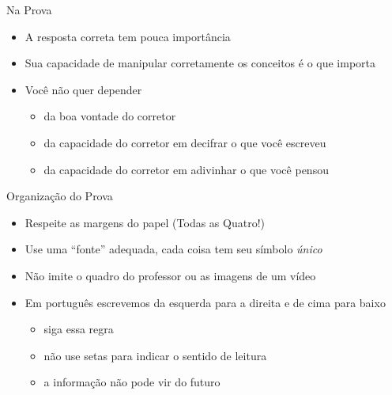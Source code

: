 \documentclass[fleqn,utf8,aspectratio=169,12pt]{beamer}
\begin{document}
\begin{frame}{Na Prova}
  \begin{itemize}[<+->]
    \item A resposta correta tem pouca importância
    \item Sua capacidade de manipular corretamente os conceitos é o que importa
    \item Você não quer depender
    \begin{itemize}
      \item da boa vontade do corretor
      \item da capacidade do corretor em decifrar o que você escreveu
      \item da capacidade do corretor em adivinhar o que você pensou
    \end{itemize}
  \end{itemize}
\end{frame}

\begin{frame}{Organização do Prova}
  \begin{itemize}[<+->]
    \item Respeite as margens do papel (Todas as Quatro!)
    \item Use uma ``fonte'' adequada, cada coisa tem seu símbolo \emph{único}
    \item Não imite o quadro do professor ou as imagens de um vídeo
    \item Em português escrevemos da esquerda para a direita e de cima para baixo
    \begin{itemize}
      \item siga essa regra
      \item não use setas para indicar o sentido de leitura
      \item a informação não pode vir do futuro
    \end{itemize}
  \end{itemize}
\end{frame}
\end{document}
